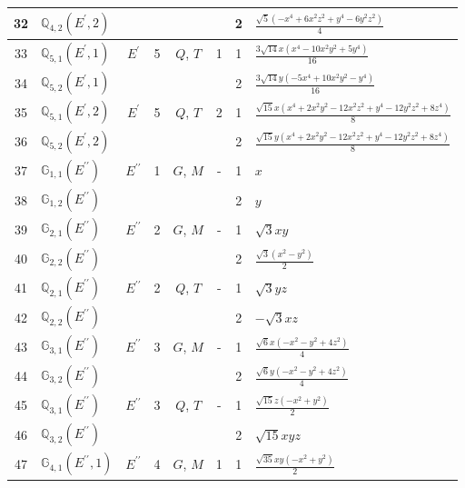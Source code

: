 \documentclass[fleqn,10pt,landscape]{jsarticle}
\begin{document}
\begin{longtable}[l]{clcccccl}
32 & $\mathbb{Q}_{4,2}(E^{\prime},2)$ &  &  &  &  & 2 & $\frac{\sqrt{5} \left(- x^{4} + 6 x^{2} z^{2} + y^{4} - 6 y^{2} z^{2}\right)}{4}$ \\ \hline
33 & $\mathbb{Q}_{5,1}(E^{\prime},1)$ & $E^{\prime}$ & 5 & $Q$, $T$ & 1 & 1 & $\frac{3 \sqrt{14} x \left(x^{4} - 10 x^{2} y^{2} + 5 y^{4}\right)}{16}$ \\
34 & $\mathbb{Q}_{5,2}(E^{\prime},1)$ &  &  &  &  & 2 & $\frac{3 \sqrt{14} y \left(- 5 x^{4} + 10 x^{2} y^{2} - y^{4}\right)}{16}$ \\ \hline
35 & $\mathbb{Q}_{5,1}(E^{\prime},2)$ & $E^{\prime}$ & 5 & $Q$, $T$ & 2 & 1 & $\frac{\sqrt{15} x \left(x^{4} + 2 x^{2} y^{2} - 12 x^{2} z^{2} + y^{4} - 12 y^{2} z^{2} + 8 z^{4}\right)}{8}$ \\
36 & $\mathbb{Q}_{5,2}(E^{\prime},2)$ &  &  &  &  & 2 & $\frac{\sqrt{15} y \left(x^{4} + 2 x^{2} y^{2} - 12 x^{2} z^{2} + y^{4} - 12 y^{2} z^{2} + 8 z^{4}\right)}{8}$ \\ \hline
37 & $\mathbb{G}_{1,1}(E^{\prime\prime})$ & $E^{\prime\prime}$ & 1 & $G$, $M$ & - & 1 & $x$ \\
38 & $\mathbb{G}_{1,2}(E^{\prime\prime})$ &  &  &  &  & 2 & $y$ \\ \hline
39 & $\mathbb{G}_{2,1}(E^{\prime\prime})$ & $E^{\prime\prime}$ & 2 & $G$, $M$ & - & 1 & $\sqrt{3} x y$ \\
40 & $\mathbb{G}_{2,2}(E^{\prime\prime})$ &  &  &  &  & 2 & $\frac{\sqrt{3} \left(x^{2} - y^{2}\right)}{2}$ \\ \hline
41 & $\mathbb{Q}_{2,1}(E^{\prime\prime})$ & $E^{\prime\prime}$ & 2 & $Q$, $T$ & - & 1 & $\sqrt{3} y z$ \\
42 & $\mathbb{Q}_{2,2}(E^{\prime\prime})$ &  &  &  &  & 2 & $- \sqrt{3} x z$ \\ \hline
43 & $\mathbb{G}_{3,1}(E^{\prime\prime})$ & $E^{\prime\prime}$ & 3 & $G$, $M$ & - & 1 & $\frac{\sqrt{6} x \left(- x^{2} - y^{2} + 4 z^{2}\right)}{4}$ \\
44 & $\mathbb{G}_{3,2}(E^{\prime\prime})$ &  &  &  &  & 2 & $\frac{\sqrt{6} y \left(- x^{2} - y^{2} + 4 z^{2}\right)}{4}$ \\ \hline
45 & $\mathbb{Q}_{3,1}(E^{\prime\prime})$ & $E^{\prime\prime}$ & 3 & $Q$, $T$ & - & 1 & $\frac{\sqrt{15} z \left(- x^{2} + y^{2}\right)}{2}$ \\
46 & $\mathbb{Q}_{3,2}(E^{\prime\prime})$ &  &  &  &  & 2 & $\sqrt{15} x y z$ \\ \hline
47 & $\mathbb{G}_{4,1}(E^{\prime\prime},1)$ & $E^{\prime\prime}$ & 4 & $G$, $M$ & 1 & 1 & $\frac{\sqrt{35} x y \left(- x^{2} + y^{2}\right)}{2}$ \\

\end{longtable}
\end{document}
